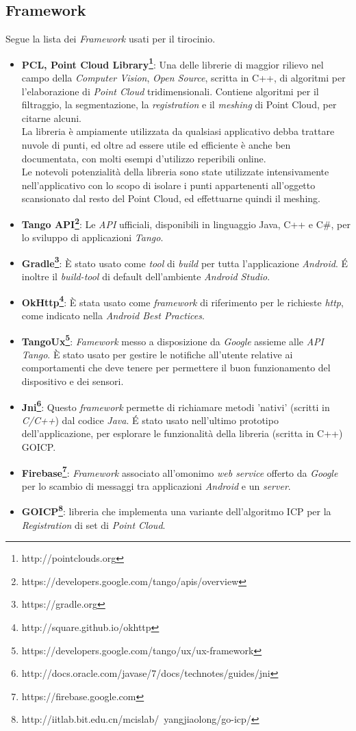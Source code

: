 \subsection{Framework}
Segue la lista dei \emph{Framework} usati per il tirocinio.
\begin{itemize}
	\item \textbf{PCL, Point Cloud Library\footnote{http://pointclouds.org}}: Una  delle librerie di maggior rilievo nel campo della \emph{Computer Vision}, \emph{Open Source}, scritta in C++, di algoritmi per l'elaborazione di \emph{Point Cloud} tridimensionali. Contiene algoritmi per il filtraggio, la segmentazione, la \emph{registration} e il \emph{meshing} di Point Cloud, per citarne alcuni. \\
La libreria è ampiamente utilizzata da qualsiasi applicativo debba trattare nuvole di punti, ed oltre ad essere utile ed efficiente è anche ben documentata, con molti esempi d'utilizzo reperibili online.\\
Le notevoli potenzialità della libreria sono state utilizzate intensivamente nell'applicativo con lo scopo di isolare i punti appartenenti all'oggetto scansionato dal resto del Point Cloud, ed effettuarne quindi il meshing.

	\item \textbf{Tango API\footnote{https://developers.google.com/tango/apis/overview}}: Le \emph{API} ufficiali, disponibili in linguaggio Java, C++ e C\#, per lo sviluppo di applicazioni \emph{Tango}.
	\item \textbf{Gradle\footnote{https://gradle.org}}: È stato usato come \emph{tool} di \emph{build} per tutta l'applicazione \emph{Android}. \'E inoltre il \emph{build-tool} di default dell'ambiente \emph{Android Studio}.
	\item \textbf{OkHttp\footnote{http://square.github.io/okhttp}}: È stata usato come \emph{framework} di riferimento per le richieste \emph{http}, come indicato nella \emph{Android Best Practices}.
	\item \textbf{TangoUx\footnote{https://developers.google.com/tango/ux/ux-framework}}: \emph{Famework} messo a disposizione da \emph{Google} assieme alle \emph{API Tango}. È stato usato per gestire le notifiche all'utente relative ai comportamenti che deve tenere per permettere il buon funzionamento del dispositivo e dei sensori.
	\item \textbf{Jni\footnote{http://docs.oracle.com/javase/7/docs/technotes/guides/jni}}: Questo \emph{framework} permette di richiamare metodi 'nativi' (scritti in \emph{C/C++}) dal codice \emph{Java}. \'E stato usato nell'ultimo prototipo dell'applicazione, per esplorare le funzionalità della libreria (scritta in C++) GOICP.
	\item \textbf{Firebase\footnote{https://firebase.google.com}}: \emph{Framework} associato all'omonimo \emph{web service} offerto da \emph{Google} per lo scambio di messaggi tra applicazioni \emph{Android} e un \emph{server}.
	\item \textbf{GOICP\footnote{http://iitlab.bit.edu.cn/mcislab/~yangjiaolong/go-icp/}}: libreria che implementa una variante dell'algoritmo ICP per la \emph{Registration} di set di \emph{Point Cloud}.
\end{itemize}

